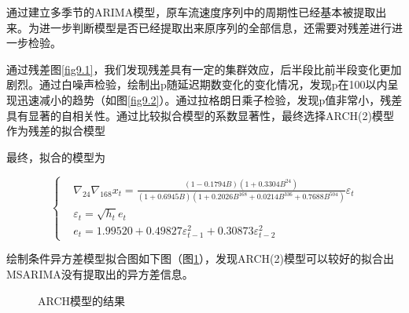 \documentclass[lang=cn,11pt,a4paper]{elegantpaper}
\begin{document}
通过建立多季节的ARIMA模型，原车流速度序列中的周期性已经基本被提取出来。为进一步判断模型是否已经提取出来原序列的全部信息，还需要对残差进行进一步检验。

通过残差图\ref{fig9.1}，我们发现残差具有一定的集群效应，后半段比前半段变化更加剧烈。通过白噪声检验，绘制出p随延迟期数变化的变化情况，发现p在100以内呈现迅速减小的趋势（如图\ref{fig9.2}）。通过拉格朗日乘子检验，发现p值非常小，残差具有显著的自相关性。通过比较拟合模型的系数显著性，最终选择ARCH(2)模型作为残差的拟合模型

最终，拟合的模型为

\begin{equation}
\left\{
\begin{aligned}
&\nabla_{24}\nabla_{168}x_t=\frac{(1-0.1794B)(1+0.3304B^{24})}{(1+0.6945B)(1+0.2026B^{168}+0.0214B^{336}+0.7688B^{504})}\varepsilon_t\\
&\varepsilon_t=\sqrt{h_t}e_t\\
&e_t=1.99520+0.49827\varepsilon_{t-1}^2+0.30873\varepsilon_{t-2}^2
\end{aligned}
\right.
\end{equation}

绘制条件异方差模型拟合图如下图（图\ref{fig6}），发现ARCH(2)模型可以较好的拟合出MSARIMA没有提取出的异方差信息。

\begin{figure}[H]
\centering  %
\caption{ARCH模型的结果}
\label{fig6}
\end{figure}
\end{document}
